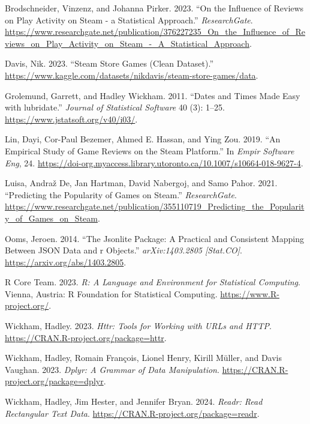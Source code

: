 \documentclass[
  letterpaper,
  DIV=11,
  numbers=noendperiod]{scrartcl}
\newlength{\cslhangindent}
\newlength{\cslentryspacingunit} %
\newenvironment{CSLReferences}[2] %
 {%
  \setlength{\parindent}{0pt}
  \ifodd #1
  \let\oldpar\par
  \def\par{\hangindent=\cslhangindent\oldpar}
  \fi
  \setlength{\parskip}{#2\cslentryspacingunit}
 }%
 {}
\begin{document}
\hypertarget{refs}{}
\begin{CSLReferences}{1}{0}
\leavevmode{}%
Brodschneider, Vinzenz, and Johanna Pirker. 2023. {``On the Influence of
Reviews on Play Activity on Steam - a Statistical Approach.''}
\emph{ResearchGate}.
\url{https://www.researchgate.net/publication/376227235_On_the_Influence_of_Reviews_on_Play_Activity_on_Steam_-_A_Statistical_Approach}.

\leavevmode{}%
Davis, Nik. 2023. {``Steam Store Games (Clean Dataset).''}
\url{https://www.kaggle.com/datasets/nikdavis/steam-store-games/data}.

\leavevmode{}%
Grolemund, Garrett, and Hadley Wickham. 2011. {``Dates and Times Made
Easy with {lubridate}.''} \emph{Journal of Statistical Software} 40 (3):
1--25. \url{https://www.jstatsoft.org/v40/i03/}.

\leavevmode{}%
Lin, Dayi, Cor-Paul Bezemer, Ahmed E. Hassan, and Ying Zou. 2019. {``An
Empirical Study of Game Reviews on the Steam Platform.''} In \emph{Empir
Software Eng}, 24.
\url{https://doi-org.myaccess.library.utoronto.ca/10.1007/s10664-018-9627-4}.

\leavevmode{}%
Luisa, Andraž De, Jan Hartman, David Nabergoj, and Samo Pahor. 2021.
{``Predicting the Popularity of Games on Steam.''} \emph{ResearchGate}.
\url{https://www.researchgate.net/publication/355110719_Predicting_the_Popularity_of_Games_on_Steam}.

\leavevmode{}%
Ooms, Jeroen. 2014. {``The Jsonlite Package: A Practical and Consistent
Mapping Between JSON Data and r Objects.''} \emph{arXiv:1403.2805
{[}Stat.CO{]}}. \url{https://arxiv.org/abs/1403.2805}.

\leavevmode{}%
R Core Team. 2023. \emph{R: A Language and Environment for Statistical
Computing}. Vienna, Austria: R Foundation for Statistical Computing.
\url{https://www.R-project.org/}.

\leavevmode{}%
Wickham, Hadley. 2023. \emph{Httr: Tools for Working with URLs and
HTTP}. \url{https://CRAN.R-project.org/package=httr}.

\leavevmode{}%
Wickham, Hadley, Romain François, Lionel Henry, Kirill Müller, and Davis
Vaughan. 2023. \emph{Dplyr: A Grammar of Data Manipulation}.
\url{https://CRAN.R-project.org/package=dplyr}.

\leavevmode{}%
Wickham, Hadley, Jim Hester, and Jennifer Bryan. 2024. \emph{Readr: Read
Rectangular Text Data}. \url{https://CRAN.R-project.org/package=readr}.

\end{CSLReferences}
\end{document}
